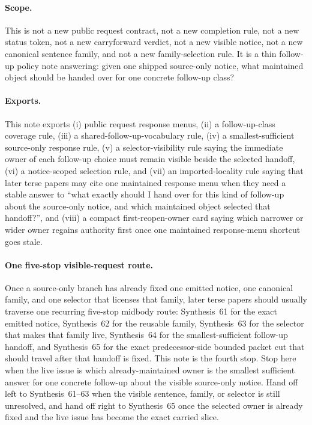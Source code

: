 \documentclass[11pt]{article}
\begin{document}
\paragraph{Scope.}
This is not a new public request contract, not a new completion rule, not a new status token, not a new carryforward verdict, not a new visible notice, not a new canonical sentence family, and not a new family-selection rule.
It is a thin follow-up policy note answering: given one shipped source-only notice, what maintained object should be handed over for one concrete follow-up class?

\paragraph{Exports.}
This note exports (i) public request response menus, (ii) a follow-up-class coverage rule, (iii) a shared-follow-up-vocabulary rule, (iv) a smallest-sufficient source-only response rule, (v) a selector-visibility rule saying the immediate owner of each follow-up choice must remain visible beside the selected handoff, (vi) a notice-scoped selection rule, and (vii) an imported-locality rule saying that later terse papers may cite one maintained response menu when they need a stable answer to ``what exactly should I hand over for this kind of follow-up about the source-only notice, and which maintained object selected that handoff?'', and (viii) a compact first-reopen-owner card saying which narrower or wider owner regains authority first once one maintained response-menu shortcut goes stale.


\paragraph{One five-stop visible-request route.}
Once a source-only branch has already fixed one emitted notice, one canonical family, and one selector that licenses that family, later terse papers should usually traverse one recurring five-stop midbody route: Synthesis~61 for the exact emitted notice, Synthesis~62 for the reusable family, Synthesis~63 for the selector that makes that family live, Synthesis~64 for the smallest-sufficient follow-up handoff, and Synthesis~65 for the exact predecessor-side bounded packet cut that should travel after that handoff is fixed. This note is the fourth stop. Stop here when the live issue is which already-maintained owner is the smallest sufficient answer for one concrete follow-up about the visible source-only notice. Hand off left to Synthesis~61--63 when the visible sentence, family, or selector is still unresolved, and hand off right to Synthesis~65 once the selected owner is already fixed and the live issue has become the exact carried slice.
\end{document}
